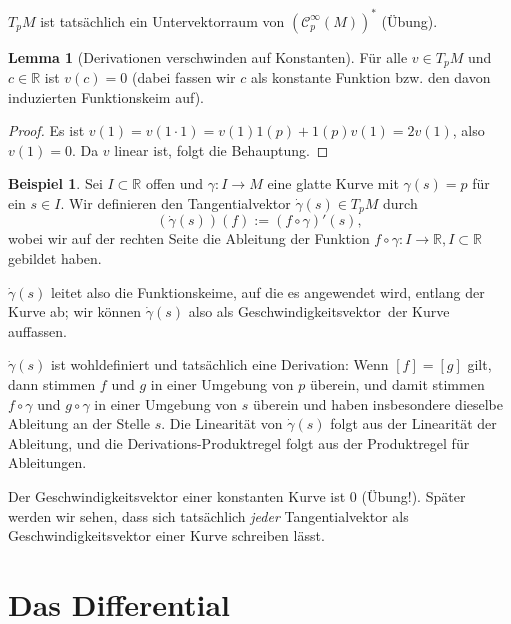 \documentclass[a4paper]{scrbook}
\numberwithin{equation}{chapter}
\newcommand{\sC}{\mathcal{C}^{\infty}}
\theoremstyle{definition}
\newtheorem{lemma}[defn]{Lemma}
\newtheorem{bsp}[defn]{Beispiel}
\begin{document}
$T_pM$ ist tatsächlich ein Untervektorraum von $(\sC_p(M))^*$ (Übung).

\begin{lemma}[Derivationen verschwinden auf Konstanten]
	Für alle $v \in T_pM$ und $c \in \mathbb R$ ist $v(c) = 0$ (dabei fassen wir $c$ als konstante Funktion bzw. den davon induzierten Funktionskeim auf).
	
	\begin{proof}
		Es ist $v(1) = v(1\cdot 1) = v(1) 1(p) + 1(p) v(1) = 2 v(1)$, also $v(1) = 0$. Da $v$ linear ist, folgt die Behauptung.
	\end{proof}
\end{lemma}

\begin{bsp} \label{bsp:kurve_geschw}
	Sei $I\subset\mathbb R$ offen und $\gamma\colon I \to M$ eine glatte Kurve mit $\gamma(s) = p$ für ein $s \in I$. Wir definieren den Tangentialvektor $\dot\gamma(s) \in T_pM$ durch \[(\dot\gamma(s))(f) := (f\circ\gamma)'(s),\] wobei wir auf der rechten Seite die Ableitung der Funktion $f\circ\gamma \colon I \to \mathbb R, I \subset \mathbb R$ gebildet haben.

	$\dot\gamma(s)$ leitet also die Funktionskeime, auf die es angewendet wird, entlang der Kurve ab; wir können $\dot\gamma(s)$ also als \glqq Geschwindigkeitsvektor\grqq\ der Kurve auffassen.

	$\dot\gamma(s)$ ist wohldefiniert und tatsächlich eine Derivation: Wenn $[f] = [g]$ gilt, dann stimmen $f$ und $g$ in einer Umgebung von $p$ überein, und damit stimmen $f\circ\gamma$ und $g\circ\gamma$ in einer Umgebung von $s$ überein und haben insbesondere dieselbe Ableitung an der Stelle $s$. Die Linearität von $\dot\gamma(s)$ folgt aus der Linearität der Ableitung, und die Derivations-Produktregel folgt aus der Produktregel für Ableitungen.
\end{bsp}

Der Geschwindigkeitsvektor einer konstanten Kurve ist 0 (Übung!). Später werden wir sehen, dass sich tatsächlich \emph{jeder} Tangentialvektor als Geschwindigkeitsvektor einer Kurve schreiben lässt.

\section{Das Differential}
\end{document}

